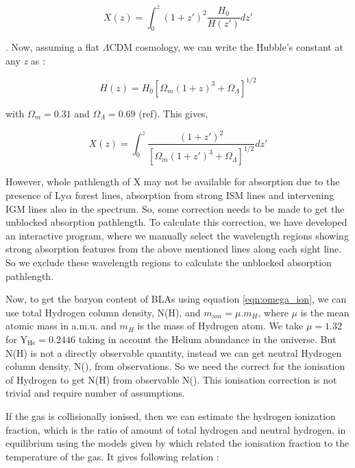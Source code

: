 \begin{equation}
    X(z)=\int_0^z  (1+z')^2 \frac{H_0}{H(z')} dz'
\end{equation}

\citep{Bahcall-1969}. Now, assuming a flat $\Lambda \text{CDM}$ cosmology, we can write the Hubble's constant at any \emph{z} as :

\begin{equation}
    H(z) = H_0 \left[\Omega_m(1+z)^3+\Omega_\Lambda\right]^{1/2}
\end{equation}

with $\Omega_m=0.31$ and $\Omega_\Lambda=0.69$ (ref). This gives,

\begin{equation}
    X(z)=\int_0^z  \frac{(1+z')^2}{\left[\Omega_m(1+z')^3+\Omega_\Lambda\right]^{1/2}} dz'
\end{equation}

However, whole pathlength of X may not be available for absorption due to the presence of Ly$\alpha$ forest lines, absorption from strong ISM lines and intervening IGM lines also in the spectrum. So, some correction needs to be made to get the unblocked absorption pathlength. To calculate this correction, we have developed an interactive program, where we manually select the wavelength regions showing strong absorption features from the above mentioned lines along each sight line. So we exclude these wavelength regions to calculate the unblocked absorption pathlength.

Now, to get the baryon content of BLAs using equation \ref{eqn:omega_ion}, we can use total Hydrogen column density, N(H), and $m_{ion}=\mu . m_H$, where $\mu$ is the mean atomic mass in a.m.u. and $m_H$ is the mass of Hydrogen atom. We take $\mu=1.32$ for $\text{Y}_\text{He}=0.2446$ \citep{Peimbert-2016} taking in account the Helium abundance in the universe. But N(H) is not a directly observable quantity, instead we can get neutral Hydrogen column density, N(), from observations. So we need the correct for the ionisation of Hydrogen to get N(H) from observable N(). This ionisation correction is not trivial and require number of assumptions.

If the gas is collisionally ionised, then we can estimate the hydrogen ionization fraction, which is the ratio of amount of total hydrogen and neutral hydrogen, in equilibrium using the models given by \citet{Sutherland-1993} which related the ionisation fraction to the temperature of the gas. It gives following relation :

